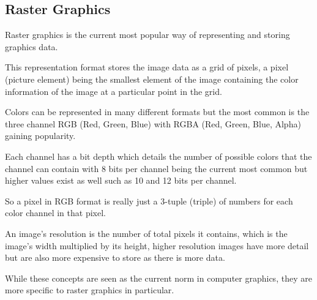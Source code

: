 \documentclass[12pt]{article}
\newcommand{\sentence}{} %
\begin{document}
    \subsection{Raster Graphics}\label{subsec:raster-graphics}

    \tab
    Raster graphics is the current most popular way of representing and storing graphics data.
    \sentence
    This representation format stores the image data as a grid of pixels, a pixel (picture element) being the
    smallest element of the image containing the color information of the image at a particular point in the grid.
    \sentence
    Colors can be represented in many different formats but the most common is the three channel RGB (Red, Green, Blue)
    with RGBA (Red, Green, Blue, Alpha) gaining popularity.
    \sentence
    Each channel has a bit depth which details the number of possible colors that the channel can contain with 8 bits
    per channel being the current most common but higher values exist as well such as 10 and 12 bits per channel.
    \sentence
    So a pixel in RGB format is really just a 3-tuple (triple) of numbers for each color channel in that pixel.
    \sentence
    An image's resolution is the number of total pixels it contains, which is the image's width multiplied by its
    height, higher resolution images have more detail but are also more expensive to store as there is more data.
    \sentence
    While these concepts are seen as the current norm in computer graphics, they are more specific to raster graphics
    in particular.
    \sentence
\end{document}
